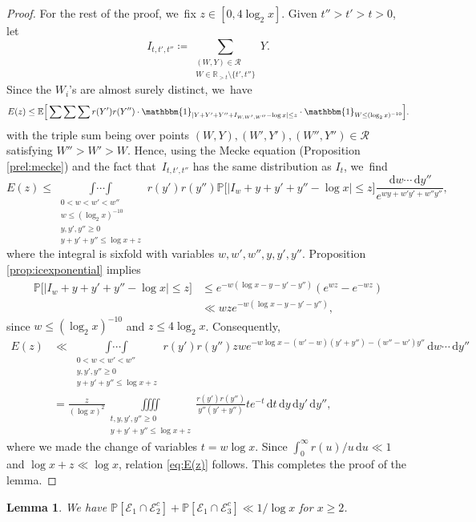 \documentclass[10pt]{amsart}
\newcommand{\RR}{\mathbb{R}}
\newcommand{\PP}{\mathbb{P}}
\newcommand{\EE}{\mathbb{E}}
\newcommand{\dee}{\,\mathrm{d}}
\newcommand{\one}{\mathbbm{1}}
\newcommand{\EC}{\mathcal{E}}
\newcommand{\RS}{\mathscr{R}}
\newcommand{\bg}{\big}
\newcommand{\bgg}{\Big}
\theoremstyle{plain}
\newtheorem{lem}[cor]{Lemma}
\theoremstyle{definition}
\begin{document}
\begin{proof}
For the rest of the proof, we~fix $z\in[0,4\log_2x]$.
Given $t''>t'>t > 0$, let
\[
I_{t,t',t''}\coloneqq \sum_{\substack{(W,Y)\in\RS\\ W\in\RR_{>t}\setminus\{t',t''\}}} Y.
\]
Since the $W_i$'s are almost surely distinct, we~have
\begin{align*}
E(z) \le \EE\bgg[ \mathop{\sum\sum\sum}
r(Y')r(Y'') \cdot \one_{|Y+Y'+Y''+I_{W,W',W''}-\log x|\le z} \cdot \one_{W \le (\log_2x)^{-10}} \bgg].
\end{align*}
with the triple sum being over points $(W,Y),(W',Y'),(W'',Y'')\in\RS$ satisfying \hbox{$W''>W'>W$}. Hence, using the Mecke equation (Proposition \ref{prel:mecke}) and the fact that~$I_{t, t', t''}$ has the same distribution as $I_{t}$, we~find
\[
E(z) \le \mathop{\int\cdots\int}\limits_{\substack{0<w<w'<w'' \\ w\le (\log_2x)^{-10} \\ y,y',y''\ge0 \\ y+y'+y''\le \log x+z }} r(y')r(y'')
\PP\bgg[ \bg|I_w+y+y'+y''-\log x\bg|\le z\bgg]
\frac{\dee w\cdots \dee y''}{ e^{wy+w'y'+w''y''}},
\]
where the integral is sixfold with variables $w,w',w'',y,y',y''$. Proposition \ref{prop:icexponential} implies
\begin{align*}
\PP\bgg[ \bg|I_w+y+y'+y''-\log x\bg|\le z\bgg] &\le e^{-w(\log x-y-y'-y'')} (e^{wz}-e^{-wz}) \\
&\ll wz e^{-w(\log x-y-y'-y'')},
\end{align*}
since $w\le(\log_2x)^{-10}$ and $z\le 4\log_2x$. Consequently,
\[
\begin{split}
E(z) &\ll
\mathop{\int\cdots\int}\limits_{\substack{0<w<w'<w'' \\ y,y',y''\ge0 \\ y+y'+y''\le \log x+z }} r(y')r(y'')
zwe^{-w\log x-(w'-w)(y'+y'')-(w''-w')y''}\dee w\cdots \dee y'' \\
&= \frac{z}{(\log x)^2} \iiiint\limits_{\substack{t,y,y',y''\ge 0 \\ y+y'+y''\le \log x+z }} \frac{r(y')r(y'')}{y''(y'+y'')}
t e^{-t} \dee t\dee y\dee y'\dee y'',
\end{split}
\]
where we made the change of variables $t=w\log x$. Since $\int_0^\infty r(u)/u \dee u\ll 1$ and $\log x+z\ll\log x$, relation \eqref{eq:E(z)} follows. This completes the proof of the lemma.
\end{proof}

\begin{lem}
\label{lem:prob e2c e3c}
We have $\PP[\EC_1 \cap \EC_2^c] + \PP[\EC_1 \cap \EC_3^c] \ll 1/\log x$ for $x\ge2$.
\end{lem}
\end{document}
